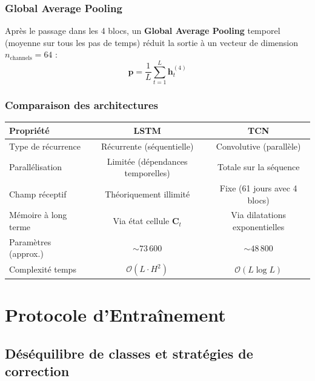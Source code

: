 \documentclass[12pt,a4paper]{report}
\begin{document}
\subsection{Global Average Pooling}

Après le passage dans les 4 blocs, un \textbf{Global Average Pooling} temporel
(moyenne sur tous les pas de temps) réduit la sortie à un vecteur de dimension
$n_\text{channels} = 64$ :
\begin{equation}
  \mathbf{p} = \frac{1}{L} \sum_{t=1}^{L} \mathbf{h}^{(4)}_t
\end{equation}

\subsection{Comparaison des architectures}

\begin{center}
\begin{tabular}{lcc}
\toprule
\rowcolor{fireOrange!15}
\textbf{Propriété} & \textcolor{lstmBlue}{\textbf{LSTM}} & \textcolor{tcnRed}{\textbf{TCN}} \\
\midrule
Type de récurrence & Récurrente (séquentielle) & Convolutive (parallèle) \\
Parallélisation & Limitée (dépendances temporelles) & Totale sur la séquence \\
Champ réceptif & Théoriquement illimité & Fixe (61 jours avec 4 blocs) \\
Mémoire à long terme & Via état cellule $\mathbf{C}_t$ & Via dilatations exponentielles \\
Paramètres (approx.) & $\sim 73\,600$ & $\sim 48\,800$ \\
Complexité temps & $\mathcal{O}(L \cdot H^2)$ & $\mathcal{O}(L \log L)$ \\
\bottomrule
\end{tabular}
\end{center}

\clearpage

\chapter{Protocole d'Entraînement}
\label{chap:training}

\section{Déséquilibre de classes et stratégies de correction}
\end{document}
